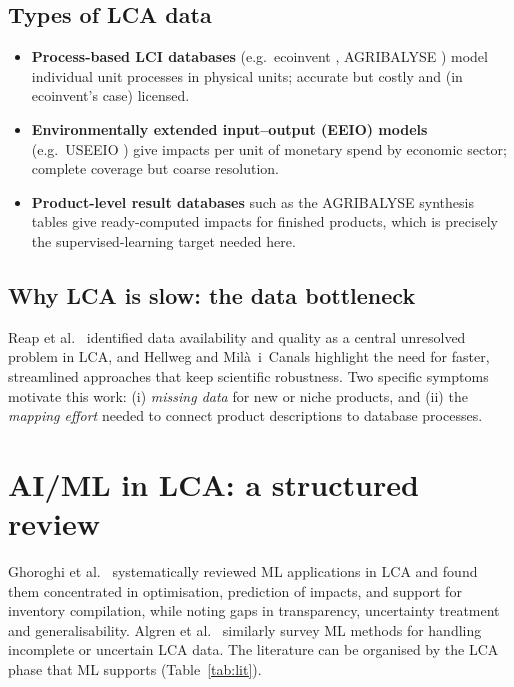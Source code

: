 \subsection{Types of LCA data}

\begin{itemize}
  \item \textbf{Process-based LCI databases} (e.g.\ ecoinvent \citep{wernet2016}, AGRIBALYSE
  \citep{agribalyse2020}) model individual unit processes in physical units; accurate but costly
  and (in ecoinvent's case) licensed.
  \item \textbf{Environmentally extended input--output (EEIO) models} (e.g.\ USEEIO
  \citep{yang2017useeio}) give impacts per unit of monetary spend by economic sector; complete
  coverage but coarse resolution.
  \item \textbf{Product-level result databases} such as the AGRIBALYSE synthesis tables give
  ready-computed impacts for finished products, which is precisely the supervised-learning target
  needed here.
\end{itemize}

\subsection{Why LCA is slow: the data bottleneck}

Reap et al.\ \citep{reap2008} identified data availability and quality as a central unresolved
problem in LCA, and Hellweg and Milà~i~Canals \citep{hellweg2014} highlight the need for faster,
streamlined approaches that keep scientific robustness. Two specific symptoms motivate this work:
(i) \emph{missing data} for new or niche products, and (ii) the \emph{mapping effort} needed to
connect product descriptions to database processes.

\section{AI/ML in LCA: a structured review}

Ghoroghi et al.\ \citep{ghoroghi2022} systematically reviewed ML applications in LCA and found
them concentrated in optimisation, prediction of impacts, and support for inventory compilation,
while noting gaps in transparency, uncertainty treatment and generalisability. Algren et al.\
\citep{algren2021} similarly survey ML methods for handling incomplete or uncertain LCA data.
The literature can be organised by the LCA phase that ML supports (Table~\ref{tab:lit}).

